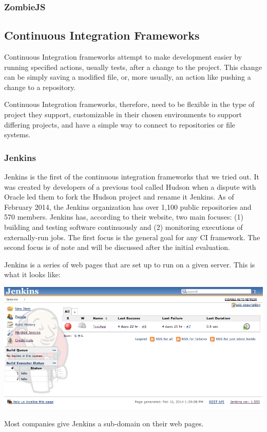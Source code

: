 \documentclass[11pt]{article}
\newenvironment{Figure}
  {\par\medskip\noindent\minipage{\linewidth}}
  {\endminipage\par\medskip}
\begin{document}
\subsubsection{ZombieJS\cite{ZombieJS}}

\subsection{Continuous Integration Frameworks}
Continuous Integration frameworks attempt to make development easier by running specified actions, usually tests, after a change to the project. This change can be simply saving a modified file, or, more usually, an action like pushing a change to a repository.

Continuous Integration frameworks, therefore, need to be flexible in the type of project they support, customizable in their chosen environments to support differing projects, and have a simple way to connect to repositories or file systems.

\subsubsection{Jenkins \cite{Jenkins}}
Jenkins is the first of the continuous integration frameworks that we tried out. It was created by developers of a previous tool called Hudson when a dispute with Oracle led them to fork the Hudson project and rename it Jenkins. As of February 2014, the Jenkins organization has over 1,100 public repositories and 570 members. \cite{JenkinsGitHub} Jenkins has, according to their website, two main focuses: (1) building and testing software continuously and (2) monitoring executions of externally-run jobs. The first focus is the general goal for any CI framework. The second focus is of note and will be discussed after the initial evaluation. 

Jenkins is a series of web pages that are set up to run on a given server. This is what it looks like:
\begin{Figure}
  \centering
  \includegraphics[width=0.95\linewidth]{jenkins.png}
\end{Figure}
Most companies give Jenkins a sub-domain on their web pages.
\end{document}
